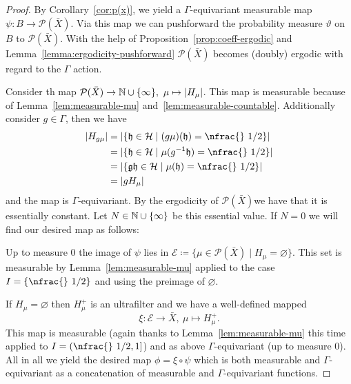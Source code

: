 \begin{proof}
  By Corollary~\ref{cor:p(x)}, we yield a \(\Gamma\)-equivariant measurable map \(\psi\colon B \to \mathcal{P}(\bar X)\). Via this map we can pushforward the probability measure \(\vartheta\) on \(B\) to \(\mathcal{P}(\bar X)\). With the help of Proposition~\ref{prop:coeff-ergodic} and Lemma~\ref{lemma:ergodicity-pushforward} \(\mathcal{P}(\bar X)\) becomes (doubly) ergodic with regard to the \(\Gamma\) action.

  Consider th map \(\mathcal{P}(\bar X) \to \mathbb{N} \cup \{\infty\},\ \mu \mapsto |H_\mu|\). This map is measurable because of Lemma~\ref{lem:measurable-mu} and~\ref{lem:measurable-countable}. Additionally consider \(g \in \Gamma\), then we have
  \begin{align*}
    |H_{g\mu}|
    & = |\{\mathfrak{h} \in \mathcal{H} \mid (g\mu)(\mathfrak{h}) = \text{\nfrac{} 1/2}\}|\\
    & = |\{\mathfrak{h} \in \mathcal{H} \mid \mu(g^{-1} \mathfrak{h}) = \text{\nfrac{} 1/2}\}|\\
    & = |\{\mathfrak{gh} \in \mathcal{H} \mid \mu(\mathfrak{h}) = \text{\nfrac{} 1/2}\}|\\
    & = |g H_\mu|
  \end{align*}
  and the map is \(\Gamma\)-equivariant. By the ergodicity of \(\mathcal{P}(\bar X)\)we have that it is essentially constant. Let \(N \in \mathbb{N} \cup \{\infty\}\) be this essential value. If \(N = 0\) we will find our desired map as follows:

  Up to measure 0 the image of \(\psi\) lies in \(\mathcal{E} \coloneqq \{ \mu \in \mathcal{P}(\bar X) \mid H_\mu = \varnothing\}\). This set is measurable by Lemma~\ref{lem:measurable-mu} applied to the case \(I = \{\text{\nfrac{} 1/2}\}\) and using the preimage of \(\varnothing\).

  If \(H_\mu = \varnothing\) then \(H_\mu^+\) is an ultrafilter and we have a well-defined mapped
  \[
    \xi\colon \mathcal{E} \to \bar X,\ \mu \mapsto H_\mu^+.
  \]
  This map is measurable (again thanks to Lemma~\ref{lem:measurable-mu} this time applied to \(I = (\text{\nfrac{} 1/2}, 1]\)) and as above \(\Gamma\)-equivariant (up to measure 0). All in all we yield the desired map \(\phi = \xi \circ \psi\) which is both measurable and \(\Gamma\)-equivariant as a concatenation of measurable and \(\Gamma\)-equivariant functions.


\end{proof}
